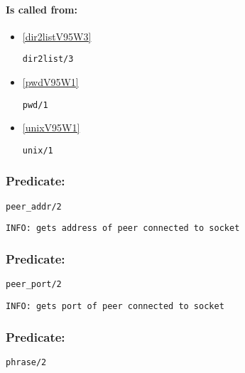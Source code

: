 \paragraph{Is called from:} 
\begin{itemize}
\item \ref{dir2listV95W3} 
\begin{verbatim}
dir2list/3
\end{verbatim}

\item \ref{pwdV95W1} 
\begin{verbatim}
pwd/1
\end{verbatim}

\item \ref{unixV95W1} 
\begin{verbatim}
unix/1
\end{verbatim}

\end{itemize}

\subsubsection{Predicate:} \label{peerV95WaddrV95W2}

\begin{verbatim}
peer_addr/2
\end{verbatim}

{\small \begin{verbatim}
INFO: gets address of peer connected to socket

\end{verbatim}}

\subsubsection{Predicate:} \label{peerV95WportV95W2}

\begin{verbatim}
peer_port/2
\end{verbatim}

{\small \begin{verbatim}
INFO: gets port of peer connected to socket

\end{verbatim}}

\subsubsection{Predicate:} \label{phraseV95W2}

\begin{verbatim}
phrase/2
\end{verbatim}

